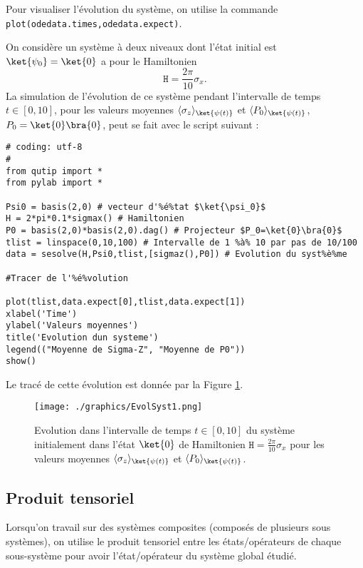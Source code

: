 Pour visualiser l'évolution du système, on utilise la commande 
\texttt{plot(odedata.times,odedata.expect)}.

\begin{example}
On considère un système à deux niveaux dont l'état initial est 
$\ket{\psi_0}=\ket{0}$ a pour le Hamiltonien
\begin{equation}
\mathtt{H} = \frac{2\pi}{10}\sigma_x.
\end{equation}
La simulation de l'évolution de ce système pendant l'intervalle de temps 
$t\in[0,10]$, pour les valeurs moyennes $\av{\sigma_z}_{\ket{\psi(t)}}$ et 
$\av{P_0}_{\ket{\psi(t)}}$, $P_0=\ket{0}\bra{0}$, peut se fait avec le 
script suivant :
\end{example}
\begin{lstlisting}[commentstyle=\scriptsize]
# coding: utf-8 
#
from qutip import *
from pylab import *

Psi0 = basis(2,0) # vecteur d'%é%tat $\ket{\psi_0}$
H = 2*pi*0.1*sigmax() # Hamiltonien
P0 = basis(2,0)*basis(2,0).dag() # Projecteur $P_0=\ket{0}\bra{0}$
tlist = linspace(0,10,100) # Intervalle de 1 %à% 10 par pas de 10/100
data = sesolve(H,Psi0,tlist,[sigmaz(),P0]) # Evolution du syst%è%me

#Tracer de l'%é%volution

plot(tlist,data.expect[0],tlist,data.expect[1])
xlabel('Time')
ylabel('Valeurs moyennes')
title('Evolution dun systeme')
legend(("Moyenne de Sigma-Z", "Moyenne de P0"))
show()
\end{lstlisting}
Le tracé de cette évolution est donnée par la Figure 
\ref{fig:EvolSyst1}.
\begin{figure}[htbp]
\centering
 \texttt{[image: ./graphics/EvolSyst1.png]}
 \caption{Evolution dans l'intervalle de temps $t\in[0,10]$ du système 
initialement dans l'état $\ket{0}$ de Hamiltonien $\mathtt{H} = 
\frac{2\pi}{10}\sigma_x$ pour les valeurs moyennes 
$\av{\sigma_z}_{\ket{\psi(t)}}$ et $\av{P_0}_{\ket{\psi(t)}}$.}
 \label{fig:EvolSyst1}
\end{figure}

\subsection{Produit tensoriel} 
\label{sec:tensor}

Lorsqu'on travail sur des systèmes composites (composés de plusieurs sous 
systèmes), on utilise le produit tensoriel entre les états/opérateurs de chaque 
sous-système pour avoir l'état/opérateur du système global étudié.

